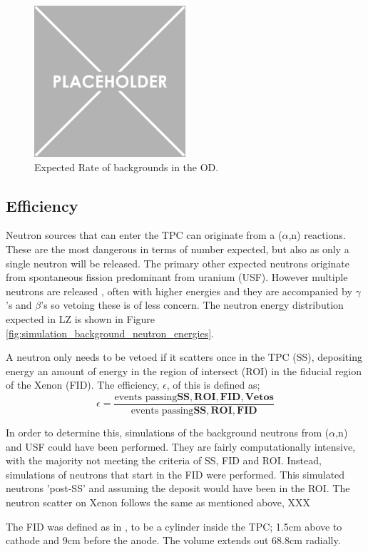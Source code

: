 \begin{figure}
    \centering
    \includegraphics[width=0.5\textwidth]{Figures/Placeholder.png}
    \caption{Expected Rate of backgrounds in the OD.}
    \label{fig:OD_estimated_background_rate}
\end{figure}



\subsection{Efficiency}
\par
Neutron sources that can enter the TPC can originate from a ($\alpha$,n) reactions.
These are the most dangerous in terms of number expected, but also as only a single neutron will be released.
The primary other expected neutrons originate from spontaneous fission predominant from uranium (USF).
However multiple neutrons are released \cite{usf_ref}, often with higher energies and they are accompanied by $\gamma$'s and $\beta$'s so vetoing these is of less concern.
The neutron energy distribution expected in LZ is shown in Figure \ref{fig:simulation_background_neutron_energies}.


\par
A neutron only needs to be vetoed if it scatters once in the TPC (SS), depositing energy an amount of energy in the region of intersect (ROI) in the fiducial region of the Xenon (FID).
The efficiency, $\epsilon$, of this is defined as;
\begin{equation}
    \epsilon = \frac{\text{events passing}\mathbf{SS, ROI, FID, Vetos}}{\text{events passing}\mathbf{SS, ROI, FID}}
    \label{eq:neutron_efficiency}
\end{equation}

\par
In order to determine this, simulations of the background neutrons from ($\alpha$,n) and USF could have been performed.
They are fairly computationally intensive, with the majority not meeting the criteria of SS, FID and ROI.
Instead, simulations of neutrons that start in the FID were performed.
This simulated neutrons 'post-SS' and assuming the deposit would have been in the ROI.
The neutron scatter on Xenon follows the same as mentioned above, XXX
\par
The FID was defined as in \cite{LZ_TechnicalDesignReview_ref}, to be a cylinder inside the TPC; 1.5cm above to cathode and 9cm before the anode.
The volume extends out 68.8cm radially.

